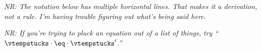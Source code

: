 \documentclass[]{article}
\newcommand\nr[1]{\leavevmode\emph{NR: #1}}
\begin{document}

\newcommand\GeCtxStuckRule[1][Left]{%
\inferrule*[#1=\textsc{ (Ge-Ctx-Stuck) }]
    {\inferrule*{}{\EquationTempStuck} 
    \and
    \inferrule*{}{\CtxToRho}
    \and 
    \inferrule*{}{\EvalGeSucc[\rhohat]}
    }
    {\GeEqCtxEval}
}

\mpar{\GeCtxStuckRule}



\nr{The notation below has multiple horizontal lines.  That makes it a
derivation, not a rule.  I'm having trouble figuring out what's being
said here.}




\newcommand\GeEqStuckRule{%
\inferrule*[Left=\textsc{ (Ge-Eq-Succ) }]
{\GeCtxStuckRule[Right]}
{\GeCtxEqEval}
}

\mpar{\GeEqStuckRule}

\nr{If you're trying to pluck an equation out of a list of things, try
``$\vtempstucks \cdot \eq \cdot \vtempstucks'$.''}


\newcommand\GeCtxSuccRule[1][Left]{%
\inferrule*[#1=\textsc{ (Ge-Ctx-Succ) }]
    {\inferrule*{}{\EquationSuccess} 
    \and 
    \inferrule*{}{\EvalGeSucc[\rhohat]}
    }
    {\GeEqCtxEval}
}

\mpar{\GeCtxSuccRule}


\newcommand\GeEqSuccRule{%
\inferrule*[Left=\textsc{ (Ge-Eq-Succ) }]
    {\inferrule*{}{\GeCtxSuccRule[Right]} 
    }
    {\GeCtxEqEval}
}

\mpar{\GeEqSuccRule}



\newcommand\GeCtxFailRule[1][Left]{%
\inferrule*[#1=\textsc{ (Ge-Ctx-Fail) }]
    {\inferrule*{}{\EquationReject} 
    }
    {\GeEqCtxEvalFail}
}
\end{document}
